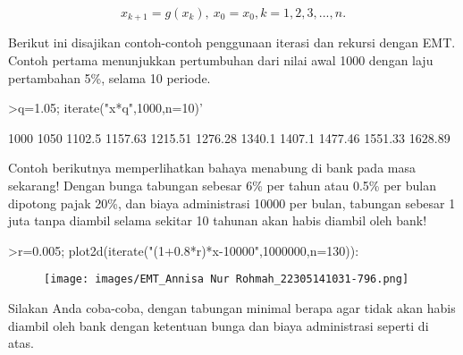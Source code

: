 \documentclass[a4paper,10pt]{article}
\begin{document}
\begin{eulernotebook}
\begin{eulercomment}
\end{eulercomment}
\begin{eulerformula}
\[
x_{k+1}=g(x_k), \ x_0=x_0, k= 1, 2, 3, ..., n.
\]
\end{eulerformula}
\begin{eulercomment}
Berikut ini disajikan contoh-contoh penggunaan iterasi dan rekursi
dengan EMT. Contoh pertama menunjukkan pertumbuhan dari nilai awal
1000 dengan laju pertambahan 5\%, selama 10 periode.
\end{eulercomment}
\begin{eulerprompt}
>q=1.05; iterate("x*q",1000,n=10)'
\end{eulerprompt}
\begin{euleroutput}
           1000 
           1050 
         1102.5 
        1157.63 
        1215.51 
        1276.28 
         1340.1 
         1407.1 
        1477.46 
        1551.33 
        1628.89 
\end{euleroutput}
\begin{eulercomment}
Contoh berikutnya memperlihatkan bahaya menabung di bank pada masa
sekarang! Dengan bunga tabungan sebesar 6\% per tahun atau 0.5\% per
bulan dipotong pajak 20\%, dan biaya administrasi 10000 per bulan,
tabungan sebesar 1 juta tanpa diambil selama sekitar 10 tahunan akan
habis diambil oleh bank!
\end{eulercomment}
\begin{eulerprompt}
>r=0.005; plot2d(iterate("(1+0.8*r)*x-10000",1000000,n=130)):
\end{eulerprompt}
\begin{figure}[h]
    \centering
    \texttt{[image: images/EMT\_Annisa Nur Rohmah\_22305141031-796.png]}
\end{figure}
\begin{eulercomment}
Silakan Anda coba-coba, dengan tabungan minimal berapa agar tidak akan
habis diambil oleh bank dengan ketentuan bunga dan biaya administrasi
seperti di atas.


\end{eulercomment}
\end{eulernotebook}
\end{document}
